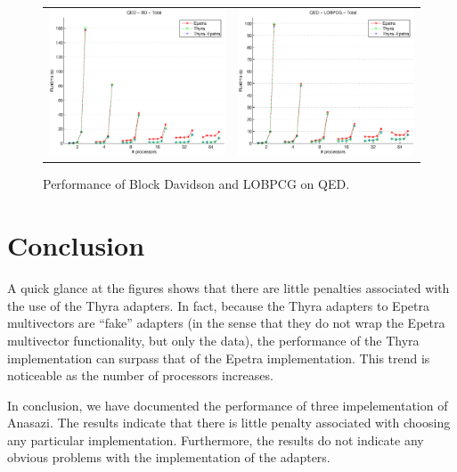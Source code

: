 \documentclass[10pt]{article}
\begin{document}
\begin{figure}[htp]
\begin{tabular}{cc}
\includegraphics[width=2.50in]{results/qed/QED-BD-Total_ln.eps} &
\includegraphics[width=2.50in]{results/qed/QED-LOBPCG-Total_ln.eps} 
\end{tabular}
\caption{Performance of Block Davidson and LOBPCG on QED.}
\label{fig:QED}
\end{figure}


\section{Conclusion}

A quick glance at the figures shows that there are little penalties associated with the
use of the Thyra adapters. In fact, because the Thyra adapters to Epetra multivectors are
``fake'' adapters (in the sense that they do not wrap the Epetra multivector
functionality, but only the data), the performance of the Thyra implementation can surpass
that of the Epetra implementation. This trend is noticeable as the number of processors
increases.

In conclusion, we have documented the performance of three impelementation of Anasazi.
The results indicate that there is little penalty associated with choosing any particular
implementation. Furthermore, the results do not indicate any obvious problems with the
implementation of the adapters.

\appendix
\end{document}
